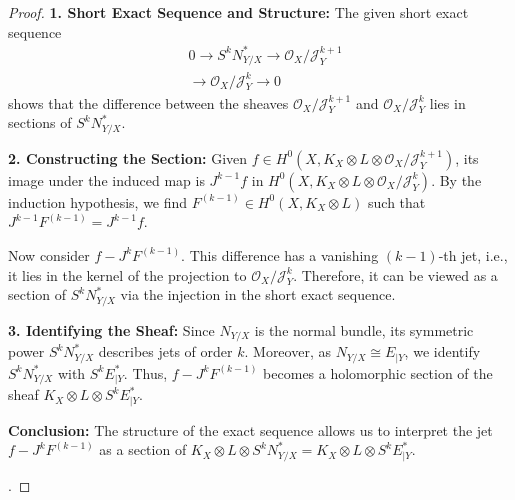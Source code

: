 \documentclass[lang=en,12pt,twoside]{textbook}
\begin{document}
\begin{proof}
{ \textbf{1. Short Exact Sequence and Structure:}
The given short exact sequence  
\[
 \begin{aligned}
 &0 \longrightarrow S^k N_{Y/X}^* \longrightarrow \mathcal{O}_X / \mathcal{J}_Y^{k+1} \\
 &\longrightarrow \mathcal{O}_X / \mathcal{J}_Y^k \longrightarrow 0
\end{aligned}
\]
shows that the difference between the sheaves \( \mathcal{O}_X / \mathcal{J}_Y^{k+1} \) and \( \mathcal{O}_X / \mathcal{J}_Y^k \) lies in sections of \( S^k N_{Y/X}^* \). 

 \textbf{2. Constructing the Section:}
Given \( f \in H^0(X, K_X \otimes L \otimes \mathcal{O}_X / \mathcal{J}_Y^{k+1}) \), its image under the induced map is \( J^{k-1} f \) in \( H^0(X, K_X \otimes L \otimes \mathcal{O}_X / \mathcal{J}_Y^k) \). By the induction hypothesis, we find \( F^{(k-1)} \in H^0(X, K_X \otimes L) \) such that \( J^{k-1} F^{(k-1)} = J^{k-1} f \). 

Now consider \( f - J^k F^{(k-1)} \). This difference has a vanishing \((k-1)\)-th jet, i.e., it lies in the kernel of the projection to \( \mathcal{O}_X / \mathcal{J}_Y^k \). Therefore, it can be viewed as a section of \( S^k N_{Y/X}^* \) via the injection in the short exact sequence.

 \textbf{3. Identifying the Sheaf:}
Since \( N_{Y/X} \) is the normal bundle, its symmetric power \( S^k N_{Y/X}^* \) describes jets of order \( k \). Moreover, as \( N_{Y/X} \cong E_{\mid Y} \), we identify \( S^k N_{Y/X}^* \) with \( S^k E_{\mid Y}^* \). Thus, \( f - J^k F^{(k-1)} \) becomes a holomorphic section of the sheaf \( K_X \otimes L \otimes S^k E_{\mid Y}^* \).

 \textbf{Conclusion:}
The structure of the exact sequence allows us to interpret the jet \( f - J^k F^{(k-1)} \) as a section of \( K_X \otimes L \otimes S^k N_{Y/X}^* = K_X \otimes L \otimes S^k E_{\mid Y}^* \).}.


\end{proof}
\end{document}
